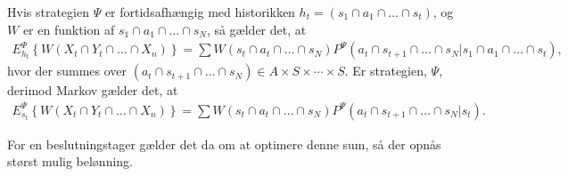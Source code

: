 Hvis strategien $\Psi$ er fortidsafhængig med historikken $h_t=(s_1\cap a_1 \cap \dots \cap s_t)$, og $W$ er en funktion af $s_1\cap a_1\cap\dots\cap s_N$, så gælder det, at
\begin{align*}
    E_{h_t}^\Psi \left\{W(X_t \cap Y_t \cap \dots \cap X_n) \right\} = \sum W(s_t \cap a_t \cap \dots \cap s_N) P^\Psi (a_t \cap s_{t+1} \cap \dots \cap s_N | s_1 \cap a_1 \cap \dots \cap s_t),
\end{align*}
hvor der summes over $(a_t \cap s_{t+1} \cap \dots \cap s_N) \in A \times S \times \cdots \times S$. Er strategien, $\Psi$, derimod Markov gælder det, at
\begin{align*}
     E_{s_t}^\Psi \left\{W(X_t \cap Y_t \cap \dots \cap X_n) \right\} = \sum W(s_t \cap a_t \cap \dots \cap s_N) P^\Psi (a_t \cap s_{t+1} \cap \dots \cap s_N | s_t).
\end{align*}

For en beslutningstager gælder det da om at optimere denne sum, så der opnås størst mulig belønning.  






